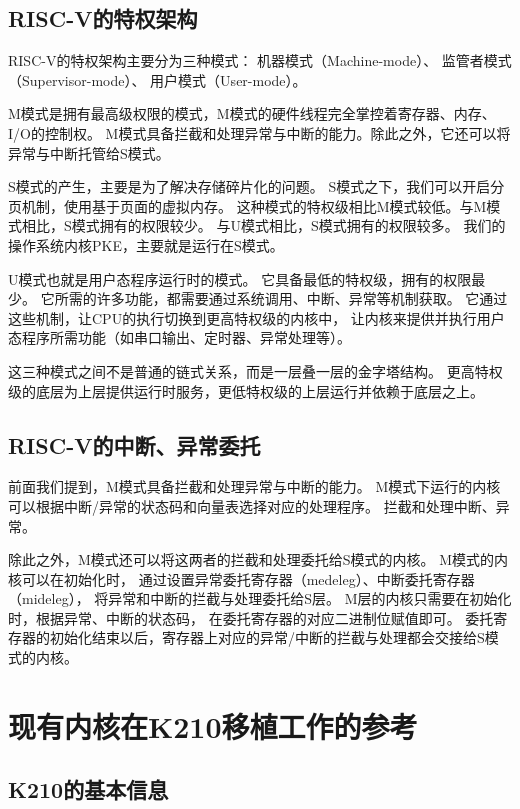 \subsection{RISC-V的特权架构}

RISC-V的特权架构主要分为三种模式：
机器模式（Machine-mode）、
监管者模式（Supervisor-mode）、
用户模式（User-mode）\cite{2015The}。

M模式是拥有最高级权限的模式，M模式的硬件线程完全掌控着寄存器、内存、I/O的控制权。
M模式具备拦截和处理异常与中断的能力。除此之外，它还可以将异常与中断托管给S模式。

S模式的产生，主要是为了解决存储碎片化的问题。
S模式之下，我们可以开启分页机制，使用基于页面的虚拟内存。
这种模式的特权级相比M模式较低。与M模式相比，S模式拥有的权限较少。
与U模式相比，S模式拥有的权限较多。
我们的操作系统内核PKE，主要就是运行在S模式。

U模式也就是用户态程序运行时的模式。
它具备最低的特权级，拥有的权限最少。
它所需的许多功能，都需要通过系统调用、中断、异常等机制获取。
它通过这些机制，让CPU的执行切换到更高特权级的内核中，
让内核来提供并执行用户态程序所需功能（如串口输出、定时器、异常处理等）。

这三种模式之间不是普通的链式关系，而是一层叠一层的金字塔结构。
更高特权级的底层为上层提供运行时服务，更低特权级的上层运行并依赖于底层之上。

\subsection{RISC-V的中断、异常委托}

前面我们提到，M模式具备拦截和处理异常与中断的能力。
M模式下运行的内核可以根据中断/异常的状态码和向量表选择对应的处理程序。
拦截和处理中断、异常。

除此之外，M模式还可以将这两者的拦截和处理委托给S模式的内核。
M模式的内核可以在初始化时，
通过设置异常委托寄存器（medeleg）、中断委托寄存器（mideleg），
将异常和中断的拦截与处理委托给S层。
M层的内核只需要在初始化时，根据异常、中断的状态码，
在委托寄存器的对应二进制位赋值即可。
委托寄存器的初始化结束以后，寄存器上对应的异常/中断的拦截与处理都会交接给S模式的内核。

\section{现有内核在K210移植工作的参考}

\subsection{K210的基本信息}

